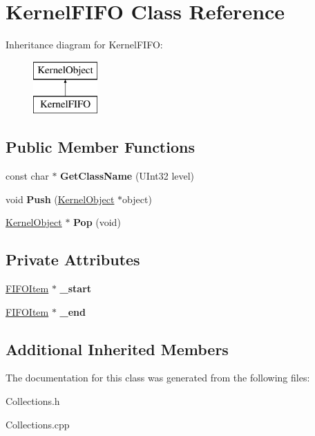 \hypertarget{class_kernel_f_i_f_o}{}\section{Kernel\+F\+I\+FO Class Reference}
\label{class_kernel_f_i_f_o}
Inheritance diagram for Kernel\+F\+I\+FO\+:\begin{figure}[H]
\begin{center}
\leavevmode
\includegraphics[height=2.000000cm]{class_kernel_f_i_f_o}
\end{center}
\end{figure}
\subsection*{Public Member Functions}
\begin{DoxyCompactItemize}
\item 
\mbox{\label{class_kernel_f_i_f_o_a9fcaab6f5950f1e7423184a5ce0c0068}} 
const char $\ast$ {\bfseries Get\+Class\+Name} (U\+Int32 level)
\item 
\mbox{\label{class_kernel_f_i_f_o_ab6faf136865bfe074ed953babd4be191}} 
void {\bfseries Push} (\hyperlink{class_kernel_object}{Kernel\+Object} $\ast$object)
\item 
\mbox{\label{class_kernel_f_i_f_o_ade5d34c4a15e0a9e02b37f8b86495440}} 
\hyperlink{class_kernel_object}{Kernel\+Object} $\ast$ {\bfseries Pop} (void)
\end{DoxyCompactItemize}
\subsection*{Private Attributes}
\begin{DoxyCompactItemize}
\item 
\mbox{\label{class_kernel_f_i_f_o_a3997fa6c31de59e6936b25c12ebce7bb}} 
\hyperlink{class_f_i_f_o_item}{F\+I\+F\+O\+Item} $\ast$ {\bfseries \+\_\+start}
\item 
\mbox{\label{class_kernel_f_i_f_o_a56a5dc9f69d3653087dadd3ecdab6c02}} 
\hyperlink{class_f_i_f_o_item}{F\+I\+F\+O\+Item} $\ast$ {\bfseries \+\_\+end}
\end{DoxyCompactItemize}
\subsection*{Additional Inherited Members}


The documentation for this class was generated from the following files\+:\begin{DoxyCompactItemize}
\item 
Collections.\+h\item 
Collections.\+cpp\end{DoxyCompactItemize}
